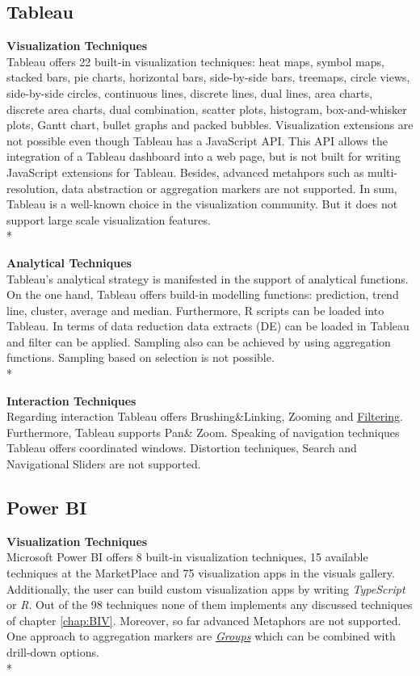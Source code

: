 \newpage
{}
\subsection*{Tableau}

\textbf{Visualization Techniques}\\
Tableau offers 22 built-in visualization techniques: heat maps, symbol maps, stacked bars, pie charts, horizontal bars, side-by-side bars, treemaps, circle views, side-by-side circles, continuous lines, discrete lines, dual lines, area charts,  discrete area charts, dual combination, scatter plots, histogram, box-and-whisker plots, Gantt chart, bullet graphs and packed bubbles.
Visualization extensions are not possible even though Tableau has a JavaScript API. This API allows the integration of a Tableau dashboard into a web page, but is not built for writing JavaScript extensions for Tableau. Besides, advanced metahpors such as multi-resolution, data abstraction or aggregation markers are not supported. 
In sum, Tableau is a well-known choice in the visualization community. But it does not support large scale visualization features. \\*

\textbf{Analytical Techniques}\\
Tableau's analytical strategy is manifested in the support of analytical functions. On the one hand, Tableau offers build-in modelling functions: prediction, trend line, cluster, average and median. Furthermore, R scripts can be loaded into Tableau.  
In terms of data reduction data extracts (DE) can be loaded in Tableau and filter can be applied. Sampling also can be achieved by using aggregation functions. Sampling based on selection is not possible.\\*

\textbf{Interaction Techniques}\\
Regarding interaction Tableau offers Brushing\&Linking, Zooming and  \hyperlink{http://kb.tableau.com/articles/howto/adding-filters-to-dashboards}{Filtering}. Furthermore, Tableau supports Pan\& Zoom. 
Speaking of navigation techniques Tableau offers coordinated windows. 
Distortion techniques, Search and Navigational Sliders are not supported. 
\newpage
\subsection*{Power BI}

\textbf{Visualization Techniques}\\
Microsoft Power BI offers 8 built-in visualization techniques, 15 available techniques at the MarketPlace and 75 visualization apps in the visuals gallery. Additionally, the user can build custom visualization apps by writing \textit{TypeScript} or \textit{R}. Out of the 98 techniques none of them implements any discussed techniques of chapter \ref{chap:BIV}. Moreover, so far advanced Metaphors are not supported\cite{Amanda}. One approach to aggregation markers are \hyperlink{https://Power BI.microsoft.com/de-de/blog/power-bi-desktop-october-feature-summary/#grouping}{\textit{Groups}} which can be combined with drill-down options.\\*

